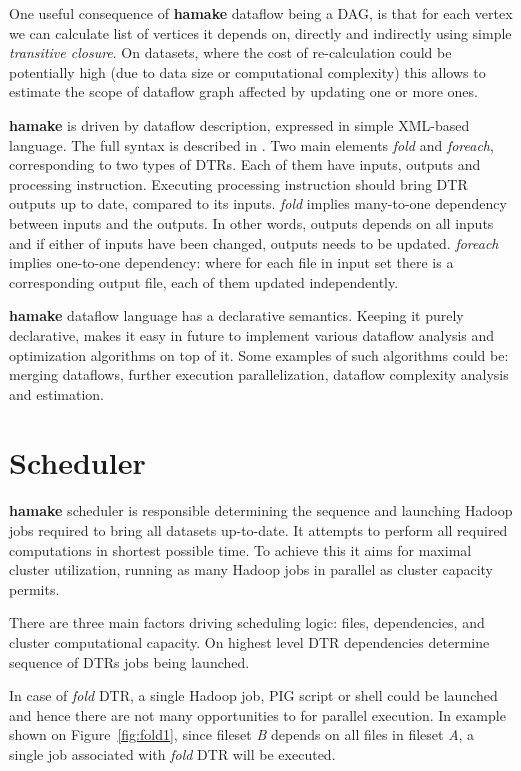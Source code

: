 \documentclass[10pt,conference,letterpaper]{IEEEtran}
\begin{document}
One useful consequence of \textbf{hamake} dataflow being a DAG, is that for
each vertex we can calculate list of vertices it depends on, directly
and indirectly using simple \textit{transitive closure}. On datasets,
where the cost of re-calculation could be potentially high (due to
data size or computational complexity) this allows to estimate the
scope of dataflow graph affected by updating one or more ones.

\textbf{hamake} is driven by dataflow description, expressed in simple
XML-based language. The full syntax is described in
\cite{hamakesyntax}. Two main elements \emph{fold} and \emph{foreach},
corresponding to two types of DTRs. Each of them have inputs, outputs
and processing instruction. Executing processing instruction should
bring DTR outputs up to date, compared to its inputs. \emph{fold}
implies many-to-one dependency between inputs and the outputs. In
other words, outputs depends on all inputs and if either of inputs
have been changed, outputs needs to be updated. \emph{foreach} implies
one-to-one dependency: where for each file in input set there is a
corresponding output file, each of them updated independently.

\textbf{hamake} dataflow language has a declarative semantics. Keeping it
purely declarative, makes it easy in future to implement various
dataflow analysis and optimization algorithms on top of it. Some
examples of such algorithms could be: merging dataflows, further
execution parallelization, dataflow complexity analysis and
estimation.

\section{Scheduler}

\textbf{hamake} scheduler is responsible determining the sequence and
launching Hadoop jobs required to bring all datasets up-to-date.  It
attempts to perform all required computations in shortest possible
time. To achieve this it aims for maximal cluster utilization, running
as many Hadoop jobs in parallel as cluster capacity permits.

There are three main factors driving scheduling logic: files,
dependencies, and cluster computational capacity. On highest level DTR
dependencies determine sequence of DTRs jobs being launched.

In case of \emph{fold} DTR, a single Hadoop job, PIG script or shell
could be launched and hence there are not many opportunities to for
parallel execution. In example shown on Figure~\ref{fig:fold1}, since
fileset \textit{B} depends on all files in fileset \textit{A}, a
single job associated with \emph{fold} DTR will be executed.
\end{document}
